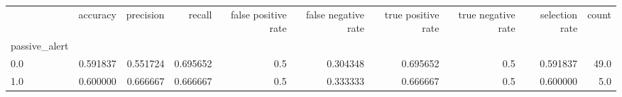 \begin{tabular}{lrrrrrrrrr}
\toprule
{} &  accuracy &  precision &    recall &  false positive rate &  false negative rate &  true positive rate &  true negative rate &  selection rate &  count \\
passive\_alert &           &            &           &                      &                      &                     &                     &                 &        \\
\midrule
0.0           &  0.591837 &   0.551724 &  0.695652 &                  0.5 &             0.304348 &            0.695652 &                 0.5 &        0.591837 &   49.0 \\
1.0           &  0.600000 &   0.666667 &  0.666667 &                  0.5 &             0.333333 &            0.666667 &                 0.5 &        0.600000 &    5.0 \\
\bottomrule
\end{tabular}
